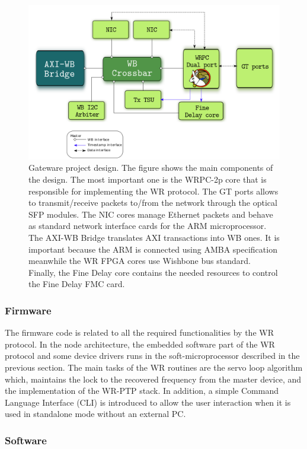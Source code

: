 \begin{figure}[H]
	\centering
	\includegraphics[scale=0.4]{img/gateware_first_level}
	\caption{Gateware project design. The figure shows the main components of the design. The most important one is the WRPC-2p core that is responsible for implementing the WR protocol. The GT ports allows to transmit/receive packets to/from the network through the optical SFP modules. The NIC cores manage Ethernet packets and behave as standard network interface cards for the ARM microprocessor. The AXI-WB Bridge translates AXI transactions into WB ones. It is important because the ARM is connected using AMBA specification meanwhile the WR FPGA cores use Wishbone bus standard. Finally, the Fine Delay core contains the needed resources to control the Fine Delay FMC card.}
	\label{fig:gateware_first_level}
\end{figure}

\subsubsection{Firmware} \label{subsec:firmware}

The firmware code is related to all the required functionalities by the WR protocol. In the node architecture, the embedded software part of the WR 
protocol and some device drivers runs in the soft-microprocessor described in 
the previous section. The main tasks of the WR routines are the servo 
loop algorithm which, maintains the lock to the recovered frequency from the 
master device, and the implementation of the WR-PTP stack. In addition, a 
simple Command Language Interface (CLI) is introduced to allow 
the user interaction when it is used in standalone mode without an external PC.

\subsubsection{Software} \label{subsec:software}

